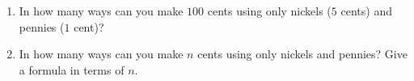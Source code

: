 \begin{enumerate}
\item[(a)] In how many ways can you make $100$ cents using only nickels ($5$ cents) and pennies ($1$ cent)?
\item[(b)] In how many ways can you make $n$ cents using only nickels and pennies? Give a formula in terms of $n$.
\end{enumerate}
